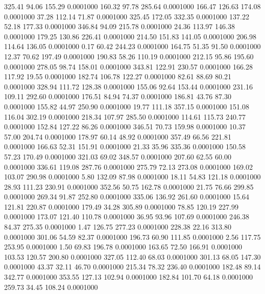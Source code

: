  325.41   94.06  155.29   0.0001000
 160.32   97.78  285.64   0.0001000
 166.47  126.63  174.08   0.0001000
  37.28  112.14   71.87   0.0001000
 325.45  172.05  332.35   0.0001000
 137.22   52.18  177.33   0.0001000
 346.84   94.09  215.78   0.0001000
  24.36  113.97  146.38   0.0001000
 179.25  130.86  226.41   0.0001000
 214.50  151.83  141.05   0.0001000
 206.98  114.64  136.05   0.0001000
   0.17   60.42  244.23   0.0001000
 164.75   51.35   91.50   0.0001000
  12.37   70.62  197.49   0.0001000
 190.83   58.26  110.19   0.0001000
 212.15   95.86  195.60   0.0001000
 278.05   98.74  158.01   0.0001000
 343.81  122.91  230.57   0.0001000
 166.28  117.92   19.55   0.0001000
 182.74  106.78  122.27   0.0001000
  82.61   88.69   80.21   0.0001000
 328.94  111.72  128.38   0.0001000
 155.06   92.64  153.44   0.0001000
 231.16  109.11  292.60   0.0001000
 176.51   84.94   74.37   0.0001000
 186.81   43.76   87.30   0.0001000
 155.82   44.97  250.90   0.0001000
  19.77  111.18  357.15   0.0001000
 151.08  116.04  302.19   0.0001000
 218.34  107.97  285.50   0.0001000
 114.61  115.73  240.77   0.0001000
 152.84  127.22   86.26   0.0001000
 346.51   70.73  159.98   0.0001000
  10.37   57.00  204.74   0.0001000
 178.97   60.14   48.92   0.0001000
 357.49   66.56  221.81   0.0001000
 166.63   52.31  151.91   0.0001000
  21.33   35.96  335.36   0.0001000
 150.58   57.23  170.49   0.0001000
 321.03   69.02  348.57   0.0001000
 207.60   62.55   60.00   0.0001000
 336.61  119.08  287.76   0.0001000
 275.79   72.13  273.08   0.0001000
 169.02  103.07  290.98   0.0001000
   5.80  132.09   87.98   0.0001000
  18.11   54.83  121.18   0.0001000
  28.93  111.23  230.91   0.0001000
 352.56   50.75  162.78   0.0001000
  21.75   76.66  299.85   0.0001000
 269.34   91.87  252.80   0.0001000
 335.06  136.92  261.60   0.0001000
  15.64  121.81  220.87   0.0001000
 179.49   34.28  305.89   0.0001000
  78.85  120.19  227.99   0.0001000
 173.07  121.40  110.78   0.0001000
  36.95   93.96  107.69   0.0001000
 246.38   84.37  275.35   0.0001000
   1.47  126.75  277.23   0.0001000
 228.38   22.16  313.80   0.0001000
 301.06   54.59   82.37   0.0001000
 196.73   60.90  111.85   0.0001000
   2.56  117.75  253.95   0.0001000
   1.50   69.83  196.78   0.0001000
 163.65   72.50  166.91   0.0001000
 103.53  120.57  200.80   0.0001000
 327.05  112.40   68.03   0.0001000
 301.13   68.05  147.30   0.0001000
  43.37   32.11   46.70   0.0001000
 215.34   78.32  236.40   0.0001000
 182.48   89.14  342.77   0.0001000
 353.55  127.13  102.94   0.0001000
 182.84  101.70   64.18   0.0001000
 259.73   34.45  108.24   0.0001000
